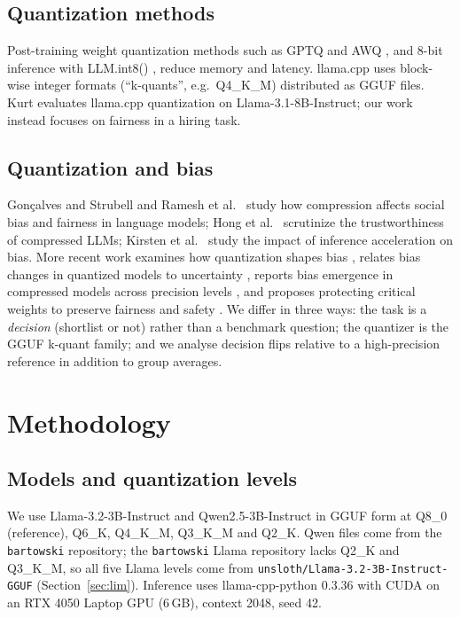 \documentclass[conference]{IEEEtran}
\begin{document}
\subsection{Quantization methods}
Post-training weight quantization methods such as GPTQ \cite{frantar2022} and AWQ \cite{lin2024}, and 8-bit inference with LLM.int8() \cite{dettmers2022}, reduce memory and latency. llama.cpp \cite{gerganov} uses block-wise integer formats (``k-quants'', e.g.\ Q4\_K\_M) distributed as GGUF files. Kurt \cite{kurt2026} evaluates llama.cpp quantization on Llama-3.1-8B-Instruct; our work instead focuses on fairness in a hiring task.

\subsection{Quantization and bias}
Gon\c{c}alves and Strubell \cite{goncalves2023} and Ramesh et al.\ \cite{ramesh2023} study how compression affects social bias and fairness in language models; Hong et al.\ \cite{hong2024} scrutinize the trustworthiness of compressed LLMs; Kirsten et al.\ \cite{kirsten2025} study the impact of inference acceleration on bias. More recent work examines how quantization shapes bias \cite{marcuzzi2026}, relates bias changes in quantized models to uncertainty \cite{hua2026}, reports bias emergence in compressed models across precision levels \cite{rath2026}, and proposes protecting critical weights to preserve fairness and safety \cite{alhakim2026}. We differ in three ways: the task is a \emph{decision} (shortlist or not) rather than a benchmark question; the quantizer is the GGUF k-quant family; and we analyse decision flips relative to a high-precision reference in addition to group averages.

\section{Methodology}
\subsection{Models and quantization levels}
We use Llama-3.2-3B-Instruct and Qwen2.5-3B-Instruct in GGUF form at Q8\_0 (reference), Q6\_K, Q4\_K\_M, Q3\_K\_M and Q2\_K. Qwen files come from the \texttt{bartowski} repository; the \texttt{bartowski} Llama repository lacks Q2\_K and Q3\_K\_M, so all five Llama levels come from \texttt{unsloth/Llama-3.2-3B-Instruct-GGUF} (Section~\ref{sec:lim}). Inference uses llama-cpp-python 0.3.36 with CUDA on an RTX 4050 Laptop GPU (6\,GB), context 2048, seed 42.
\end{document}
